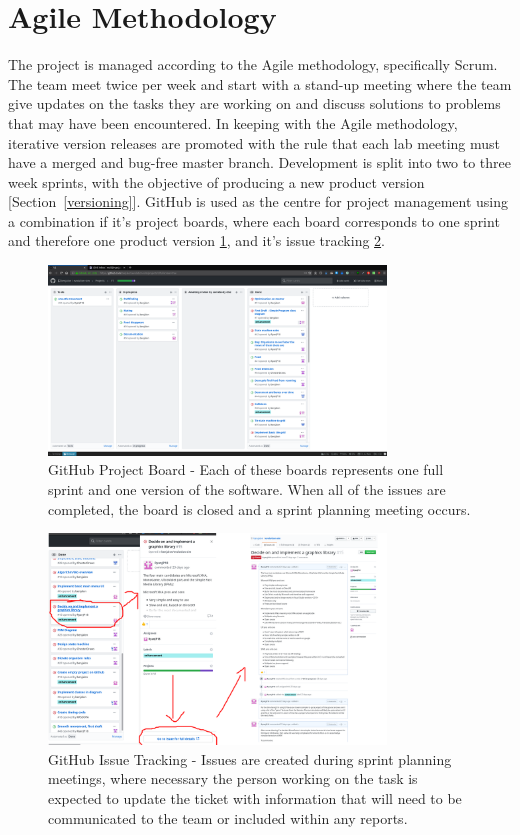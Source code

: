 \documentclass[a4paper, oneside, 11pt]{report}
\begin{document}
\section{Agile Methodology}\label{projectmanagement}
The project is managed according to the Agile methodology, specifically Scrum. The team meet twice per week and start with a stand-up meeting where the team give updates on the tasks they are working on and discuss solutions to problems that may have been encountered. In keeping with the Agile methodology, iterative version releases are promoted with the rule that each lab meeting must have a merged and bug-free master branch. Development is split into two to three week sprints, with the objective of producing a new product version [Section~\ref{versioning}].
GitHub is used as the centre for project management using a combination if it's project boards, where each board corresponds to one sprint and therefore one product version \ref{gitboard}, and it's issue tracking \ref{gitissue}. 

\begin{figure}[H]
	\centering
	\includegraphics[width=0.8\textwidth]{gitproj}
	\caption{GitHub Project Board - Each of these boards represents one full sprint and one version of the software. When all of the issues are completed, the board is closed and a sprint planning meeting occurs.}\label{gitboard}
\end{figure}

\begin{figure}[H]
	\centering
	\includegraphics[width=0.8\textwidth]{gitissuetrack}
	\caption{GitHub Issue Tracking - Issues are created during sprint planning meetings, where necessary the person working on the task is expected to update the ticket with information that will need to be communicated to the team or included within any reports.}\label{gitissue}
\end{figure}
\end{document}
